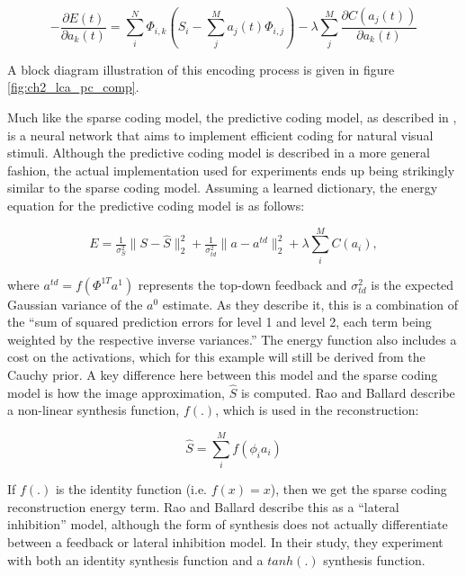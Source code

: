 \begin{equation}\label{eq:ch2_sc_deda_rewrite}
    - \frac{\partial E(t)}{\partial a_{k}(t)}
    =
        \sum\limits_{i}^{N} \Phi_{i,k} \left(S_{i} - \sum\limits_{j}^{M}a_{j}(t) \Phi_{i,j}\right) -
        \lambda \sum\limits_{j}^{M}\frac{\partial C(a_{j}(t))}{\partial a_{k}(t)}
\end{equation}

A block diagram illustration of this encoding process is given in figure \ref{fig:ch2_lca_pc_comp}.

Much like the sparse coding model, the predictive coding model, as described in \parencite{rao1997dynamic, rao1999predictive}, is a neural network that aims to implement efficient coding for natural visual stimuli. Although the predictive coding model is described in a more general fashion, the actual implementation used for experiments ends up being strikingly similar to the sparse coding model. Assuming a learned dictionary, the energy equation for the predictive coding model is as follows:

\begin{equation}\label{eq:ch2_pc_energy_func}
        E =
        \tfrac{1}{\sigma_{S}^{2}} \|S - \hat{S} \|_{2}^{2} +
        \tfrac{1}{\sigma_{td}^{2}} \|a - a^{td}\|_{2}^{2} +
        \lambda \sum\limits_{i}^{M}C(a_{i}),
\end{equation}

where $a^{td} = f\left(\Phi^{1T}a^{1}\right)$ represents the top-down feedback and $\sigma_{td}^2$ is the expected Gaussian variance of the $a^{0}$ estimate. As they describe it, this is a combination of the ``sum of squared prediction errors for level 1 and level 2, each term being weighted by the respective inverse variances.'' The energy function also includes a cost on the activations, which for this example will still be derived from the Cauchy prior. A key difference here between this model and the sparse coding model is how the image approximation, $\hat{S}$ is computed. Rao and Ballard describe a non-linear synthesis function, $f(.)$, which is used in the reconstruction:

\begin{equation}\label{eq:ch2_pc_synthesis}
 \hat{S} = \sum\limits_{i}^{M}f(\phi_{i}a_{i})
\end{equation}

If $f(.)$ is the identity function (i.e. $f(x)=x$), then we get the sparse coding reconstruction energy term. Rao and Ballard describe this as a ``lateral inhibition'' model, although the form of synthesis does not actually differentiate between a feedback or lateral inhibition model. In their study, they experiment with both an identity synthesis function and a $tanh(.)$ synthesis function.


